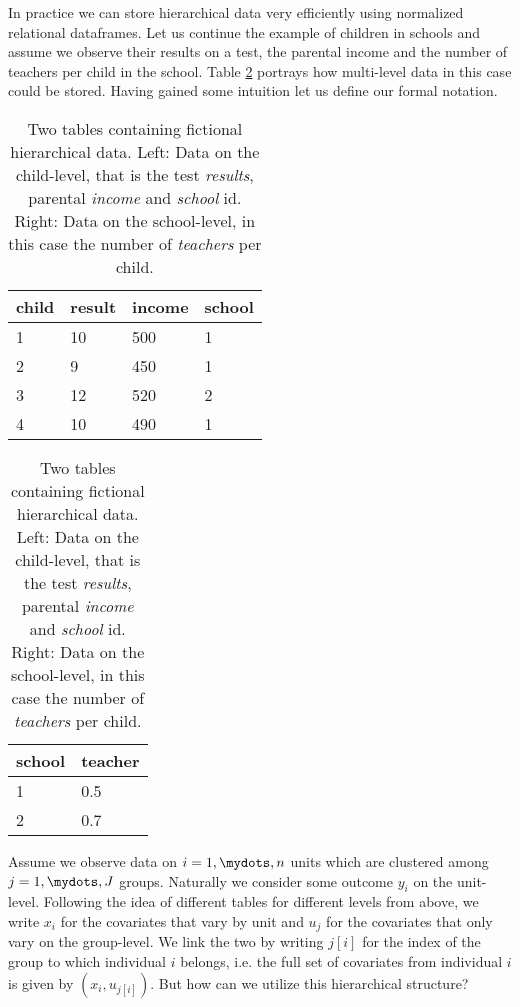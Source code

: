 In practice we can store hierarchical data very efficiently using normalized relational dataframes. Let us continue the example of children in schools and assume we observe their results on a test, the parental income and the number of teachers per child in the school.
Table \ref{tab:relational_table} portrays how multi-level data in this case could be stored.
Having gained some intuition let us define our formal notation.
\begin{table}[!ht]
\begin{center}
\begin{tabular}{l l l l}
child & result & income & school\\
\hline
1 & 10 & 500 & 1\\
2 & 9 & 450 & 1\\
3 & 12 & 520 & 2\\
4 & 10 & 490 & 1
\end{tabular}
\quad
\begin{tabular}{l l}
school & teacher\\
\hline
1 & 0.5\\
2 & 0.7
\end{tabular}
\end{center}
\caption{Two tables containing fictional hierarchical data. Left: Data on the child-level, that is the test \emph{results}, parental \emph{income} and \emph{school} id. Right: Data on the school-level, in this case the number of \emph{teachers} per child.}
\label{tab:relational_table}
\end{table}

\noindent
Assume we observe data on $i=1,\mydots,n$ units which are clustered among $j=1,\mydots,J$ groups.
Naturally we consider some outcome $y_i$ on the unit-level.
Following the idea of different tables for different levels from above, we write $x_i$ for the covariates that vary by unit and $u_j$ for the covariates that only vary on the group-level.
We link the two by writing $j[i]$ for the index of the group to which individual $i$ belongs, i.e. the full set of covariates from individual $i$ is given by $(x_i, u_{j[i]})$. But how can we utilize this hierarchical structure?

